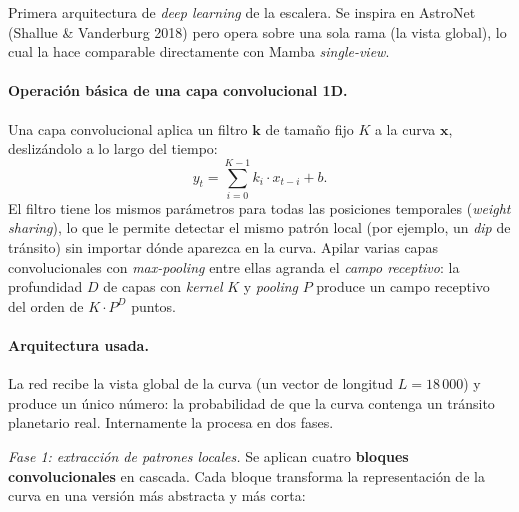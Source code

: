 \documentclass[11pt,a4paper]{article}
\begin{document}
Primera arquitectura de \textit{deep learning} de la escalera. Se
inspira en AstroNet (Shallue \& Vanderburg 2018) pero opera sobre una
sola rama (la vista global), lo cual la hace comparable
directamente con Mamba \textit{single-view}.

\paragraph{Operación básica de una capa convolucional 1D.}
Una capa convolucional aplica un filtro $\mathbf{k}$ de tamaño fijo
$K$ a la curva $\mathbf{x}$, deslizándolo a lo largo del tiempo:
\begin{equation}
y_t = \sum_{i=0}^{K-1} k_i \cdot x_{t-i} + b.
\label{eq:conv1d}
\end{equation}
El filtro tiene los mismos parámetros para todas las posiciones
temporales (\textit{weight sharing}), lo que le permite detectar el
mismo patrón local (por ejemplo, un \textit{dip} de tránsito) sin
importar dónde aparezca en la curva. Apilar varias capas
convolucionales con \textit{max-pooling} entre ellas agranda el
\textit{campo receptivo}: la profundidad $D$ de capas con \textit{kernel}
$K$ y \textit{pooling} $P$ produce un campo receptivo del orden de
$K \cdot P^D$ puntos.

\paragraph{Arquitectura usada.}
La red recibe la vista global de la curva (un vector de longitud
$L = 18\,000$) y produce un único número: la probabilidad de que la
curva contenga un tránsito planetario real. Internamente la procesa
en dos fases.

\emph{Fase 1: extracción de patrones locales.}
Se aplican cuatro \textbf{bloques convolucionales} en cascada. Cada
bloque transforma la representación de la curva en una versión más
abstracta y más corta:
\end{document}
